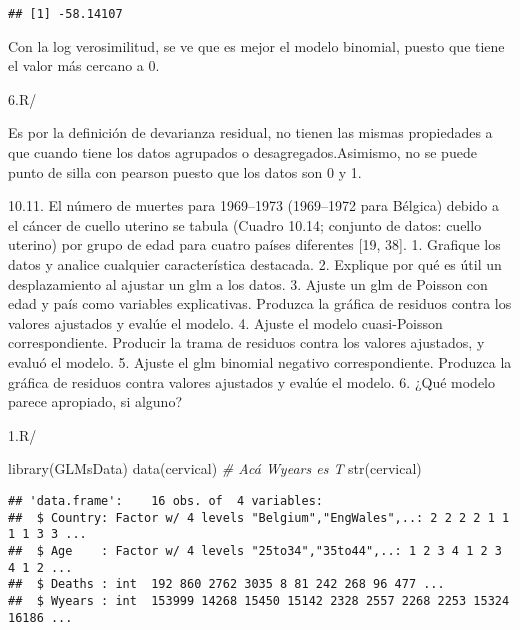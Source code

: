 \documentclass[
]{article}
\newenvironment{Shaded}{\begin{snugshade}}{\end{snugshade}}
\newcommand{\AttributeTok}[1]{\textcolor[rgb]{0.77,0.63,0.00}{#1}}
\newcommand{\CommentTok}[1]{\textcolor[rgb]{0.56,0.35,0.01}{\textit{#1}}}
\newcommand{\FunctionTok}[1]{\textcolor[rgb]{0.00,0.00,0.00}{#1}}
\newcommand{\NormalTok}[1]{#1}
\newcommand{\SpecialCharTok}[1]{\textcolor[rgb]{0.00,0.00,0.00}{#1}}
\begin{document}
\begin{Shaded}
\end{Shaded}

\begin{verbatim}
## [1] -58.14107
\end{verbatim}

Con la log verosimilitud, se ve que es mejor el modelo binomial, puesto
que tiene el valor más cercano a 0.

6.R/

Es por la definición de devarianza residual, no tienen las mismas
propiedades a que cuando tiene los datos agrupados o
desagregados.Asimismo, no se puede punto de silla con pearson puesto que
los datos son 0 y 1.

10.11. El número de muertes para 1969--1973 (1969--1972 para Bélgica)
debido a el cáncer de cuello uterino se tabula (Cuadro 10.14; conjunto
de datos: cuello uterino) por grupo de edad para cuatro países
diferentes {[}19, 38{]}. 1. Grafique los datos y analice cualquier
característica destacada. 2. Explique por qué es útil un desplazamiento
al ajustar un glm a los datos. 3. Ajuste un glm de Poisson con edad y
país como variables explicativas. Produzca la gráfica de residuos contra
los valores ajustados y evalúe el modelo. 4. Ajuste el modelo
cuasi-Poisson correspondiente. Producir la trama de residuos contra los
valores ajustados, y evaluó el modelo. 5. Ajuste el glm binomial
negativo correspondiente. Produzca la gráfica de residuos contra valores
ajustados y evalúe el modelo. 6. ¿Qué modelo parece apropiado, si
alguno?

1.R/

\begin{Shaded}
\begin{Highlighting}[]
\FunctionTok{library}\NormalTok{(GLMsData)}
\FunctionTok{data}\NormalTok{(cervical)}
\CommentTok{\# Acá Wyears es T}
\FunctionTok{str}\NormalTok{(cervical)}
\end{Highlighting}
\end{Shaded}

\begin{verbatim}
## 'data.frame':    16 obs. of  4 variables:
##  $ Country: Factor w/ 4 levels "Belgium","EngWales",..: 2 2 2 2 1 1 1 1 3 3 ...
##  $ Age    : Factor w/ 4 levels "25to34","35to44",..: 1 2 3 4 1 2 3 4 1 2 ...
##  $ Deaths : int  192 860 2762 3035 8 81 242 268 96 477 ...
##  $ Wyears : int  153999 14268 15450 15142 2328 2557 2268 2253 15324 16186 ...
\end{verbatim}
\end{document}
